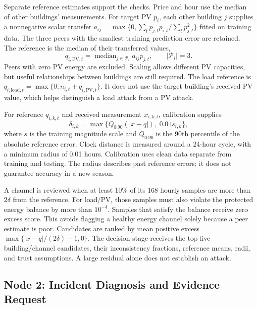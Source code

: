 \documentclass[conference]{IEEEtran}
\begin{document}
Separate reference estimates support the checks. Price and hour use the median of other buildings' measurements. For target PV $p_i$, each other building $j$ supplies a nonnegative scalar transfer $a_{ij}=\max\{0,\sum_t p_{j,t}p_{i,t}/\sum_t p_{j,t}^2\}$ fitted on training data. The three peers with the smallest training prediction error are retained. The reference is the median of their transferred values,
\begin{equation}
 q_{i,\mathrm{PV},t}=\operatorname{median}_{j\in\mathcal{P}_i}
                a_{ij}p_{j,t},\qquad |\mathcal{P}_i|=3.
\end{equation}
Peers with zero PV energy are excluded. Scaling allows different PV capacities, but useful relationships between buildings are still required. The load reference is $q_{i,\mathrm{load},t}=\max\{0,n_{i,t}+q_{i,\mathrm{PV},t}\}$. It does not use the target building's received PV value, which helps distinguish a load attack from a PV attack.

For reference $q_{i,k,t}$ and received measurement $x_{i,k,t}$, calibration supplies
\begin{equation}
\delta_{i,k}=\max\{Q_{0.90}(|x-q|),\;0.01s_{i,k}\},
\label{eq:radius}
\end{equation}
where $s$ is the training magnitude scale and $Q_{0.90}$ is the 90th percentile of the absolute reference error. Clock distance is measured around a 24-hour cycle, with a minimum radius of 0.01 hours. Calibration uses clean data separate from training and testing. The radius describes past reference errors; it does not guarantee accuracy in a new season.

A channel is reviewed when at least 10\% of its 168 hourly samples are more than $2\delta$ from the reference. For load/PV, those samples must also violate the protected energy balance by more than $10^{-4}$. Samples that satisfy the balance receive zero excess score. This avoids flagging a healthy energy channel solely because a peer estimate is poor. Candidates are ranked by mean positive excess $\max\{|x-q|/(2\delta)-1,0\}$. The decision stage receives the top five building/channel candidates, their inconsistency fractions, reference means, radii, and trust assumptions. A large residual alone does not establish an attack.

\subsection{Node 2: Incident Diagnosis and Evidence Request}
\end{document}
